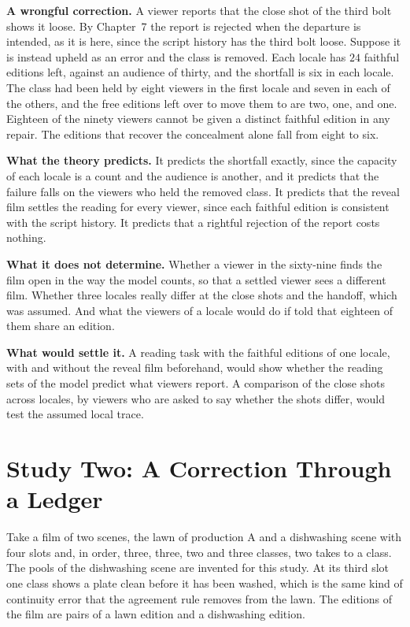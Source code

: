 \documentclass[11pt,twoside,openright]{book}
\theoremstyle{plain}
\theoremstyle{definition}
\theoremstyle{remark}
\begin{document}
\textbf{A wrongful correction.} A viewer reports that the close shot of the third bolt shows it loose. By Chapter~7 the report is rejected when the departure is intended, as it is here, since the script history has the third bolt loose. Suppose it is instead upheld as an error and the class is removed. Each locale has $24$ faithful editions left, against an audience of thirty, and the shortfall is six in each locale. The class had been held by eight viewers in the first locale and seven in each of the others, and the free editions left over to move them to are two, one, and one. Eighteen of the ninety viewers cannot be given a distinct faithful edition in any repair. The editions that recover the concealment alone fall from eight to six.

\textbf{What the theory predicts.} It predicts the shortfall exactly, since the capacity of each locale is a count and the audience is another, and it predicts that the failure falls on the viewers who held the removed class. It predicts that the reveal film settles the reading for every viewer, since each faithful edition is consistent with the script history. It predicts that a rightful rejection of the report costs nothing.

\textbf{What it does not determine.} Whether a viewer in the sixty-nine finds the film open in the way the model counts, so that a settled viewer sees a different film. Whether three locales really differ at the close shots and the handoff, which was assumed. And what the viewers of a locale would do if told that eighteen of them share an edition.

\textbf{What would settle it.} A reading task with the faithful editions of one locale, with and without the reveal film beforehand, would show whether the reading sets of the model predict what viewers report. A comparison of the close shots across locales, by viewers who are asked to say whether the shots differ, would test the assumed local trace.

\section{Study Two: A Correction Through a Ledger}\label{sec:ledger17}

Take a film of two scenes, the lawn of production A and a dishwashing scene with four slots and, in order, three, three, two and three classes, two takes to a class. The pools of the dishwashing scene are invented for this study. At its third slot one class shows a plate clean before it has been washed, which is the same kind of continuity error that the agreement rule removes from the lawn. The editions of the film are pairs of a lawn edition and a dishwashing edition.
\end{document}
